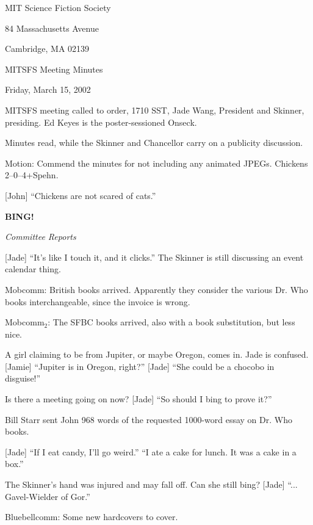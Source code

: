 \documentclass[12pt]{article}
\newcommand{\bing}{{\bf BING!} }
\newcommand{\goto}[1]{\bing \vskip 12pt \centerline{{\em{#1}}}}
\begin{document}
\begin{center}

MIT Science Fiction Society 

84 Massachusetts Avenue

Cambridge, MA 02139

\vspace{12pt}

MITSFS Meeting Minutes 

Friday, March 15, 2002

\end{center}
 
\vspace{18pt}

\setlength{\parskip}{6pt}

\noindent
MITSFS meeting called to order, 1710 SST, Jade Wang, President and
Skinner, presiding.  Ed Keyes is the poster-sessioned Onseck.

Minutes read, while the Skinner and Chancellor carry on a publicity
discussion.

Motion: Commend the minutes for not including any animated JPEGs.
Chickens 2--0--4+Spehn.

[John] ``Chickens are not scared of cats.''

\goto{Committee Reports}

[Jade] ``It's like I touch it, and it clicks.''  The Skinner is still
discussing an event calendar thing.

Mobcomm: British books arrived.  Apparently they consider the various
Dr. Who books interchangeable, since the invoice is wrong.

Mobcomm$_2$: The SFBC books arrived, also with a book substitution,
but less nice.

A girl claiming to be from Jupiter, or maybe Oregon, comes in.  Jade
is confused.  [Jamie] ``Jupiter is in Oregon, right?''  [Jade] ``She
could be a chocobo in disguise!''

Is there a meeting going on now?  [Jade] ``So should I bing to prove it?''

Bill Starr sent John 968 words of the requested 1000-word essay on
Dr. Who books.

[Jade] ``If I eat candy, I'll go weird.''  ``I ate a cake for lunch.
It was a cake in a box.''

The Skinner's hand was injured and may fall off.  Can she still bing?
[Jade] ``... Gavel-Wielder of Gor.''

Bluebellcomm: Some new hardcovers to cover.
\end{document}

